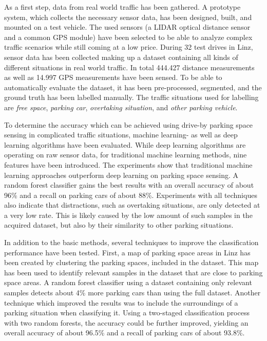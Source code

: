 As a first step, data from real world traffic has been gathered. A prototype system, which collects the necessary sensor data, has been designed, built, and mounted on a test vehicle. The used sensors (a LIDAR optical distance sensor and a common GPS module) have been selected to be able to analyze complex traffic scenarios while still coming at a low price. 
During 32 test drives in Linz, sensor data has been collected making up a dataset containing all kinds of different situations in real world traffic. 
In total 444.427 distance measurements as well as 14.997 GPS measurements have been sensed.
To be able to automatically evaluate the dataset, it has been pre-processed, segmented, and the ground truth has been labelled manually. The traffic situations used for labelling are \emph{free space}, \emph{parking car}, \emph{overtaking situation}, and \emph{other parking vehicle}.

To determine the accuracy which can be achieved using drive-by parking space sensing in complicated traffic situations, machine learning- as well as deep learning algorithms have been evaluated. While deep learning algorithms are operating on raw sensor data, for traditional machine learning methods, nine features have been introduced. The experiments show that traditional machine learning approaches outperform deep learning on parking space sensing. A random forest classifier gains the best results with an overall accuracy of about 96\% and a recall on parking cars of about 88\%. Experiments with all techniques also indicate that distractions, such as overtaking situations, are only detected at a very low rate. This is likely caused by the low amount of such samples in the acquired dataset, but also by their similarity to other parking situations.

In addition to the basic methods, several techniques to improve the classification performance have been tested. First, a map of parking space areas in Linz has been created by clustering the parking spaces, included in the dataset. This map has been used to identify relevant samples in the dataset that are close to parking space areas. A random forest classifier using a dataset containing only relevant samples detects about 4\% more parking cars than using the full dataset. Another technique which improved the results was to include the surroundings of a parking situation when classifying it. Using a two-staged classification process with two random forests, the accuracy could be further improved, yielding an overall accuracy of about 96.5\% and a recall of parking cars of about 93.8\%.

